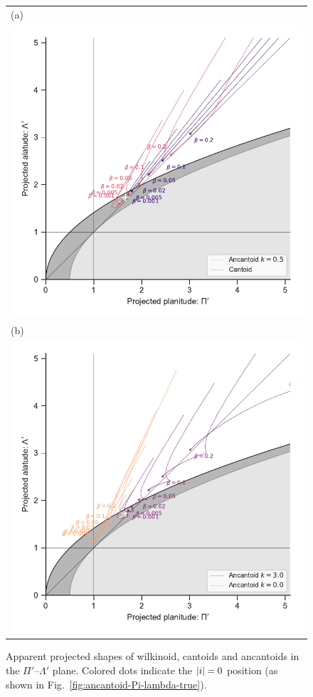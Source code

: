 \begin{figure}
  \centering
  \begin{tabular}{@{}l@{}}
    (a) \\
    \includegraphics{figs/ancantoid-R90-vs-Rc-a} \\
    (b) \\
    \includegraphics{figs/ancantoid-R90-vs-Rc-b}
  \end{tabular}
  \caption{Apparent projected shapes of wilkinoid, cantoids and
    ancantoids in the \(\Pi'\)--\(\Lambda'\) plane.  Colored dots indicate the
    \(\lvert i\rvert = 0\) position (as shown in
    Fig.~\ref{fig:ancantoid-Pi-lambda-true}).}
  \label{fig:thin-shell-R90-Rc}
\end{figure}

